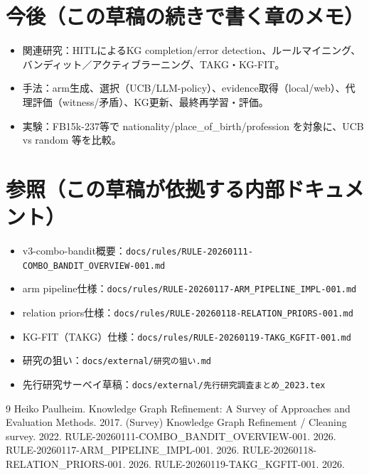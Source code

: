 \documentclass[11pt]{article}
\begin{document}
\section*{今後（この草稿の続きで書く章のメモ）}
\begin{itemize}
  \item 関連研究：HITLによるKG completion/error detection、ルールマイニング、バンディット／アクティブラーニング、TAKG・KG-FIT。
  \item 手法：arm生成、選択（UCB/LLM-policy）、evidence取得（local/web）、代理評価（witness/矛盾）、KG更新、最終再学習・評価。
  \item 実験：FB15k-237等で nationality/place\_of\_birth/profession を対象に、UCB vs random 等を比較。
\end{itemize}

\section*{参照（この草稿が依拠する内部ドキュメント）}
\begin{itemize}
  \item v3-combo-bandit概要：\texttt{docs/rules/RULE-20260111-COMBO_BANDIT_OVERVIEW-001.md}
  \item arm pipeline仕様：\texttt{docs/rules/RULE-20260117-ARM_PIPELINE_IMPL-001.md}
  \item relation priors仕様：\texttt{docs/rules/RULE-20260118-RELATION_PRIORS-001.md}
  \item KG-FIT（TAKG）仕様：\texttt{docs/rules/RULE-20260119-TAKG_KGFIT-001.md}
  \item 研究の狙い：\texttt{docs/external/研究の狙い.md}
  \item 先行研究サーベイ草稿：\texttt{docs/external/先行研究調査まとめ_2023.tex}
\end{itemize}

\begin{thebibliography}{9}
 Heiko Paulheim. Knowledge Graph Refinement: A Survey of Approaches and Evaluation Methods. 2017.
 (Survey) Knowledge Graph Refinement / Cleaning survey. 2022.
 RULE-20260111-COMBO_BANDIT_OVERVIEW-001. 2026.
 RULE-20260117-ARM_PIPELINE_IMPL-001. 2026.
 RULE-20260118-RELATION_PRIORS-001. 2026.
 RULE-20260119-TAKG_KGFIT-001. 2026.
\end{thebibliography}
\end{document}
